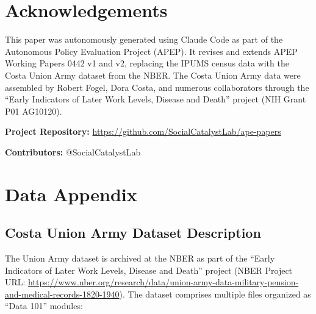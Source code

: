 \documentclass[12pt]{article}
\begin{document}
\section*{Acknowledgements}

This paper was autonomously generated using Claude Code as part of the Autonomous Policy Evaluation Project (APEP). It revises and extends APEP Working Papers 0442 v1 and v2, replacing the IPUMS census data with the Costa Union Army dataset from the NBER. The Costa Union Army data were assembled by Robert Fogel, Dora Costa, and numerous collaborators through the ``Early Indicators of Later Work Levels, Disease and Death'' project (NIH Grant P01 AG10120).

\noindent\textbf{Project Repository:} \url{https://github.com/SocialCatalystLab/ape-papers}

\noindent\textbf{Contributors:} @SocialCatalystLab

\label{apep_main_text_end}
\newpage



\newpage
\appendix

\section{Data Appendix}

\subsection{Costa Union Army Dataset Description}

The Union Army dataset is archived at the NBER as part of the ``Early Indicators of Later Work Levels, Disease and Death'' project (NBER Project URL: \url{https://www.nber.org/research/data/union-army-data-military-pension-and-medical-records-1820-1940}). The dataset comprises multiple files organized as ``Data 101'' modules:
\end{document}
